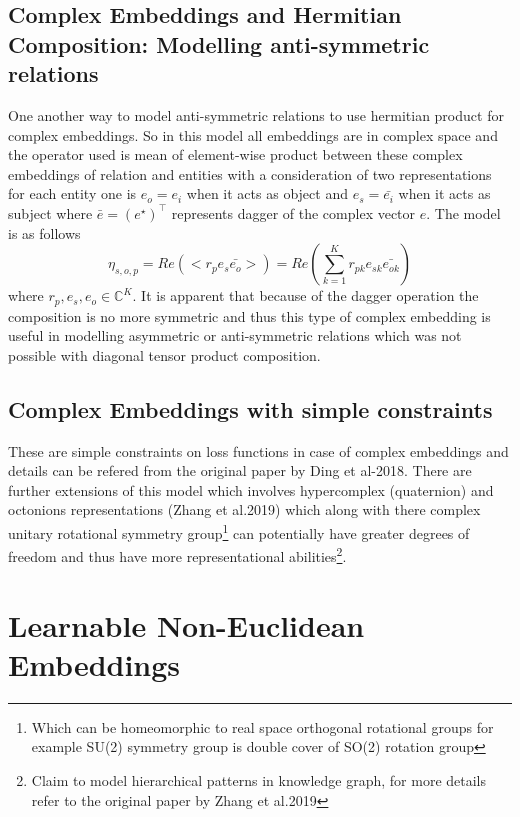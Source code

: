 \documentclass[12pt]{article}
\begin{document}
\subsection{Complex Embeddings and Hermitian Composition: Modelling anti-symmetric relations}
One another way to model anti-symmetric relations to use hermitian product for complex embeddings. So in this model all embeddings are in complex space and the operator used is mean of element-wise product between these complex embeddings of relation and entities with a consideration of two representations for each entity one is $e_{o}=e_{i}$ when it acts as object and $e_{s}=\bar{e_{i}}$ when it acts as subject where $\bar{e}=(e^{\star})^{\intercal}$ represents dagger of the complex vector $e$. The model is as follows
\begin{equation}
\eta_{s, o, p} = Re(<r_{p}e_{s}\bar{e_{o}}>) = Re(\sum_{k=1}^{K}r_{pk}e_{sk}\bar{e_{ok}})
\end{equation} where $r_{p}, e_{s}, e_{o} \in \mathbb{C}^{K}$. It is apparent that because of the dagger operation the composition is no more symmetric and thus this type of complex embedding is useful in modelling asymmetric or anti-symmetric relations which was not possible with diagonal tensor product composition.
\subsection{Complex Embeddings with simple constraints}
These are simple constraints on loss functions in case of complex embeddings and details can be refered from the original paper by Ding et al-2018. There are further extensions of this model which involves hypercomplex (quaternion) and octonions representations (Zhang et al.2019) which along with there complex unitary rotational symmetry group\footnote{Which can be homeomorphic to real space orthogonal rotational groups for example SU(2) symmetry group is double cover of SO(2) rotation group} can potentially have greater degrees of freedom and thus have more representational abilities\footnote{Claim to model hierarchical patterns in knowledge graph, for more details refer to the original paper by Zhang et al.2019}.
\section{Learnable Non-Euclidean Embeddings}
\end{document}
